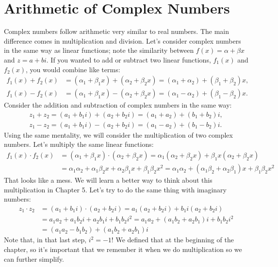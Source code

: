 \documentclass[lang=en,11pt]{elegantbook}
\begin{document}
\section{Arithmetic of Complex Numbers}
Complex numbers follow arithmetic very similar to real numbers.  The main difference comes in multiplication and division.  Let's consider complex numbers in the same way as linear functions; note the similarity between $f(x)=\alpha+\beta x$ and $z=a+bi$.  If you wanted to add or subtract two linear functions, $f_1(x)$ and $f_2(x)$, you would combine like terms: \begin{align*}
    f_1(x)+f_2(x)&=\left(\alpha_1+\beta_1 x\right)+\left(\alpha_2+\beta_2 x\right)=\left(\alpha_1+\alpha_2\right)+\left(\beta_1+\beta_2 \right)x, \\
    f_1(x)-f_2(x)&=\left(\alpha_1+\beta_1 x\right)-\left(\alpha_2+\beta_2 x\right)=\left(\alpha_1-\alpha_2\right)+\left(\beta_1-\beta_2 \right)x.
\end{align*}
Consider the addition and subtraction of complex numbers in the same way:
\begin{align*}
    z_1+z_2=\left(a_1+b_1i\right)+\left(a_2+b_2i\right)=\left(a_1+a_2\right)+\left(b_1+b_2\right)i, \\ 
    z_1-z_2=\left(a_1+b_1i\right)-\left(a_2+b_2i\right)=\left(a_1-a_2\right)+\left(b_1-b_2\right)i.
\end{align*}
Using the same mentality, we will consider the multiplication of two complex numbers.  Let's multiply the same linear functions: \begin{align*}
    f_1(x)\cdot f_2(x)&=\left(\alpha_1+\beta_1 x\right)\cdot \left(\alpha_2+\beta_2 x\right)=\alpha_1\left(\alpha_2+\beta_2 x\right)+\beta_1 x\left(\alpha_2+\beta_2 x\right) \\
    &= \alpha_1\alpha_2+\alpha_1\beta_2 x+\alpha_2\beta_1x+\beta_1\beta_2x^2=\alpha_1\alpha_2+\left(\alpha_1\beta_2+\alpha_2\beta_1\right)x+\beta_1\beta_2x^2
\end{align*}
That looks like a mess.  We will learn a better way to think about this multiplication in Chapter 5.  Let's try to do the same thing with imaginary numbers:\begin{align*}
    z_1\cdot z_2&=\left(a_1+b_1i\right)\cdot \left(a_2+b_2i\right)=a_1\left(a_2+b_2i\right)+b_1i\left(a_2+b_2i\right) \\
    &=a_1a_2+a_1b_2i+a_2b_1i+b_1b_2i^2=a_1a_2+\left(a_1b_2+a_2b_1\right)i+b_1b_2i^2 \\
    &=\left(a_1a_2-b_1b_2\right)+\left(a_1b_2+a_2b_1\right)i
\end{align*}
Note that, in that last step, $i^2=-1$!  We defined that at the beginning of the chapter, so it's important that we remember it when we do multiplication so we can further simplify.  
\end{document}
